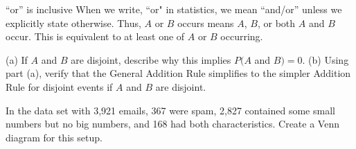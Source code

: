 \begin{onebox}{``or'' is inclusive}
When we write, ``or"  in statistics, we mean ``and/or'' unless we explicitly state otherwise. Thus, $A$ or $B$ occurs means $A$, $B$, or both $A$ and $B$ occur. This is equivalent to at least one of $A$ or $B$ occurring.\end{onebox}

\D{\newpage}

\begin{exercisewrap}
\begin{nexercise}
(a) If $A$ and $B$ are disjoint, describe why this implies $P(A$ and $B) = 0$. (b) Using part (a), verify that the General Addition Rule simplifies to the simpler Addition Rule for disjoint events if $A$ and $B$ are disjoint.\footnotemark
\end{nexercise}
\end{exercisewrap}


\begin{exercisewrap}
\begin{nexercise}\label{emailSpamNumberVennExer}
In the  data set with 3,921 emails, 367 were spam, 2,827 contained some small numbers but no big numbers, and 168 had both characteristics. Create a Venn diagram for this setup.\footnotemark
\end{nexercise}
\end{exercisewrap}

